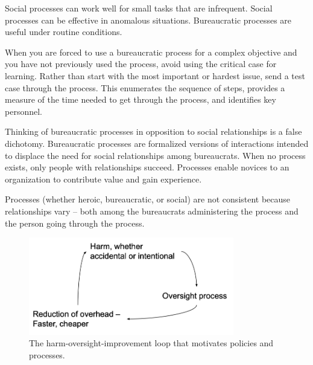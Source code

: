 Social processes can work well for small tasks that are infrequent.
Social processes can be effective in anomalous situations.
Bureaucratic processes are useful under routine conditions.

When you are forced to use a bureaucratic process for a complex objective and you have not previously used the process, avoid using the critical case for learning. Rather than start with the most important or hardest issue, send a test case through the process. 
%
This enumerates the sequence of steps, provides a measure of the time needed to get through the process, and identifies key personnel. 

Thinking of bureaucratic processes in opposition to social relationships is a false dichotomy. Bureaucratic processes are formalized versions of interactions intended to displace the need for social relationships among bureaucrats.
When no process exists, only people with relationships succeed. Processes enable novices to an organization to contribute value and gain experience. 



Processes (whether heroic, bureaucratic, or social) are not consistent because relationships vary -- both among the bureaucrats administering the process and the person going through the process.



\begin{figure}
    \centering
    \includegraphics[width=0.8\textwidth]{images/process_loop_harm-oversight-improvement}
    \caption{The harm-oversight-improvement loop that motivates policies and processes.}
    \label{fig:harm-oversight-improvement}
\end{figure}






